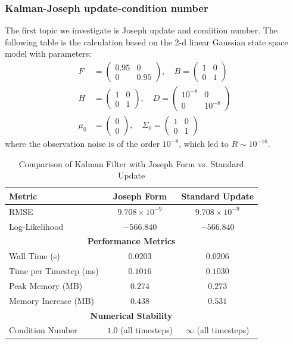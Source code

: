 \documentclass{article}
\begin{document}
\subsubsection{Kalman-Joseph update-condition number}
The first topic we investigate is Joseph update and condition number. The following table is the calculation based on the 2-d linear Gaussian state space model with parameters:
\begin{align*}
F &= \begin{pmatrix} 0.95 & 0 \\ 0 & 0.95 \end{pmatrix}, \quad
B = \begin{pmatrix} 1 & 0 \\ 0 & 1 \end{pmatrix} \\
H &= \begin{pmatrix} 1 & 0 \\ 0 & 1 \end{pmatrix}, \quad
D = \begin{pmatrix} 10^{-8} & 0 \\ 0 & 10^{-8} \end{pmatrix} \\
\mu_0 &= \begin{pmatrix} 0 \\ 0 \end{pmatrix}, \quad
\Sigma_0 = \begin{pmatrix} 1 & 0 \\ 0 & 1 \end{pmatrix}
\end{align*}
where the observation noise is of the order $10^{-8}$, which led to $R \sim 10^{-16}$.
\begin{table}[H]
\centering
\caption{Comparison of Kalman Filter with Joseph Form vs. Standard Update}
\begin{tabular}{lcc}
\hline
\textbf{Metric} & \textbf{Joseph Form} & \textbf{Standard Update} \\ 
\hline
RMSE & $9.708 \times 10^{-9}$ & $9.708 \times 10^{-9}$ \\
Log-Likelihood & $-566.840$ & $-566.840$ \\
\hline
\multicolumn{3}{c}{\textbf{Performance Metrics}} \\
\hline
Wall Time (s) & $0.0203$ & $0.0206$ \\
Time per Timestep (ms) & $0.1016$ & $0.1030$ \\
Peak Memory (MB) & $0.274$ & $0.273$ \\
Memory Increase (MB) & $0.438$ & $0.531$ \\
\hline
\multicolumn{3}{c}{\textbf{Numerical Stability}} \\
\hline
Condition Number & $1.0$ (all timesteps) & $\infty$ (all timesteps) \\
\hline
\end{tabular}
\end{table}
\end{document}
